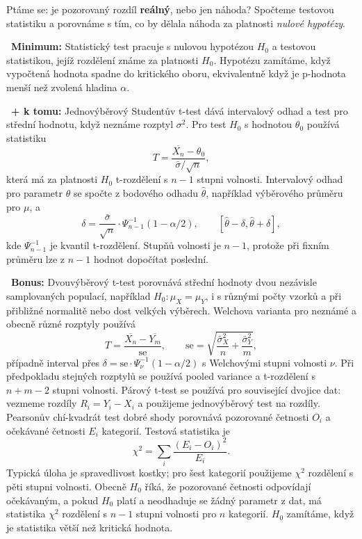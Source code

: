 \ucivo
\begin{intuice}
Ptáme se: je pozorovaný rozdíl \textbf{reálný}, nebo jen náhoda? Spočteme testovou statistiku
a porovnáme s tím, co by dělala náhoda za platnosti \emph{nulové hypotézy}.
\end{intuice}

\begin{odpoved}
\setlength{\parskip}{2pt}
\noindent{}\ \textbf{Minimum:} Statistický test pracuje s nulovou hypotézou $H_0$ a testovou statistikou, jejíž rozdělení známe za platnosti $H_0$. Hypotézu zamítáme, když vypočtená hodnota spadne do kritického oboru, ekvivalentně když je p-hodnota menší než zvolená hladina $\alpha$.\par
\noindent{}\ \textbf{+ k tomu:} Jednovýběrový Studentův t-test dává intervalový odhad a test pro střední hodnotu, když neznáme rozptyl $\sigma^2$. Pro test $H_0$ s hodnotou $\theta_0$ používá statistiku
\[
T=\frac{\overline{X_n}-\theta_0}{\bar\sigma/\sqrt n},
\]
která má za platnosti $H_0$ t-rozdělení s $n-1$ stupni volnosti. Intervalový odhad pro parametr $\theta$ se spočte z bodového odhadu $\hat\theta$, například výběrového průměru pro $\mu$, a
\[
\delta=\frac{\bar\sigma}{\sqrt n}\cdot \Psi^{-1}_{n-1}(1-\alpha/2),
\qquad
[\hat\theta-\delta,\hat\theta+\delta],
\]
kde $\Psi^{-1}_{n-1}$ je kvantil t-rozdělení. Stupňů volnosti je $n-1$, protože při fixním průměru lze z $n-1$ hodnot dopočítat poslední.\par
\noindent{}\ \textbf{Bonus:} Dvouvýběrový t-test porovnává střední hodnoty dvou nezávisle samplovaných populací, například $H_0:\mu_X=\mu_Y$, i s různými počty vzorků a při přibližné normalitě nebo dost velkých výběrech. Welchova varianta pro neznámé a obecně různé rozptyly používá
\[
T=\frac{\overline{X_n}-\overline{Y_m}}{\mathrm{se}},
\qquad
\mathrm{se}=\sqrt{\frac{\bar\sigma_X^2}{n}+\frac{\bar\sigma_Y^2}{m}},
\]
případně interval přes $\delta=\mathrm{se}\cdot\Psi_\nu^{-1}(1-\alpha/2)$ s Welchovými stupni volnosti $\nu$. Při předpokladu stejných rozptylů se používá pooled variance a t-rozdělení s $n+m-2$ stupni volnosti. Párový t-test se používá pro související dvojice dat: vezmeme rozdíly $R_i=Y_i-X_i$ a použijeme jednovýběrový test na rozdíly.
Pearsonův chí-kvadrát test dobré shody porovnává pozorované četnosti $O_i$ a očekávané četnosti $E_i$ kategorií. Testová statistika je
\[
\chi^2=\sum_i\frac{(E_i-O_i)^2}{E_i}.
\]
Typická úloha je spravedlivost kostky; pro šest kategorií použijeme $\chi^2$ rozdělení s pěti stupni volnosti. Obecně $H_0$ říká, že pozorované četnosti odpovídají očekávaným, a pokud $H_0$ platí a neodhaduje se žádný parametr z dat, má statistika $\chi^2$ rozdělení s $n-1$ stupni volnosti pro $n$ kategorií. $H_0$ zamítáme, když je statistika větší než kritická hodnota.
\end{odpoved}
